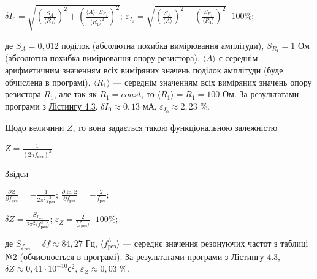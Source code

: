 \documentclass[12pt, a4paper]{article}
\begin{document}
    \begin{center}
        $\displaystyle \delta I_0 = \sqrt{\left( \frac{S_A}{\text{⟨}R_1\text{⟩}} \right)^2 + \left( \frac{\text{⟨}A\text{⟩} \cdot S_{R_1}}{\text{⟨}R_1\text{⟩}^2} \right)^2}$;
        $\displaystyle \varepsilon_{I_0} = \sqrt{\left( \frac{S_A}{\text{⟨}A\text{⟩}} \right)^2 + \left( \frac{S_{R_1}}{\text{⟨}R_1\text{⟩}} \right)^2} \cdot 100 \%$;
    \end{center}

    де $S_A = 0,012$ поділок (абсолютна похибка вимірювання амплітуди), $S_{R_1} = 1$ Ом (абсолютна похибка вимірювання опору резистора).
    $\text{⟨}A\text{⟩}$ є середнім арифметичним значенням всіх виміряних значень поділок амплітуди (буде обчислена в програмі),
    $\text{⟨}R_1\text{⟩}$ --- середнім значенням всіх виміряних значень опору резистора $R_1$, але так як $R_1 = const$, то $\text{⟨}R_1\text{⟩} = R_1 = 100$ Ом.
    За результатами програми з \hyperlink{listing3}{Лістингу 4.3}, $\delta I_0 \approx 0,13$ мА, $\varepsilon_{I_0} \approx 2,23$ \%.

    Щодо величини $Z$, то вона задається такою функціональною залежністю

    \begin{center}
        $\displaystyle Z = \frac{1}{(2\pi f_{\text{рез}})^2}$
    \end{center}

    Звідси

    \begin{center}

        $\displaystyle \frac{\partial Z}{\partial f_{\text{рез}}} = -\frac{1}{2\pi^2 f_{\text{рез}}^3}$; $\displaystyle \frac{\partial \ln Z}{\partial f_{\text{рез}}} = -\frac{2}{f_{\text{рез}}}$;

    \end{center}

    \begin{center}
        $\displaystyle \delta Z = \frac{S_{f_{\text{рез}}}}{2\pi^2 \text{⟨}f_{\text{рез}}^3\text{⟩}}$;
        $\displaystyle \varepsilon_Z = \frac{2}{\text{⟨}f_{\text{рез}}\text{⟩}}\cdot 100 \%$;
    \end{center}

    де $S_{f_{\text{рез}}} = \delta f \approx 84,27$ Гц, $\text{⟨}f_{\text{рез}}^3\text{⟩}$ --- середнє значення резонуючих частот з таблиці №2 (обчислюється в програмі).
    За результатами програми з \hyperlink{listing3}{Лістингу 4.3}, $\delta Z \approx 0,41 \cdot 10^{-10} \text{с}^2$, $\varepsilon_Z \approx 0,03$ \%.
\end{document}
